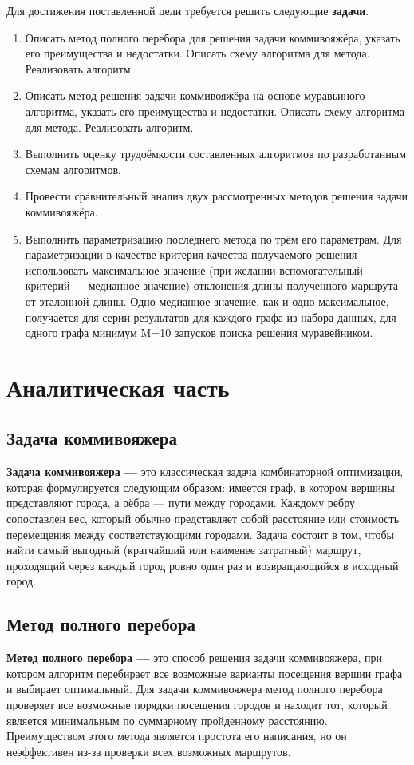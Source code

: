\documentclass[12pt, a4paper]{article}
\begin{document}
Для достижения поставленной цели требуется решить следующие 
\textbf{задачи}.
\begin{enumerate}
\item Описать метод полного перебора для решения 
задачи коммивояжёра, указать его преимущества и 
недостатки. Описать схему алгоритма для метода. 
Реализовать алгоритм.

\item Описать метод решения задачи коммивояжёра на 
основе муравьиного алгоритма, указать его 
преимущества и недостатки. Описать схему алгоритма 
для метода. Реализовать алгоритм.

\item Выполнить оценку трудоёмкости составленных 
алгоритмов по разработанным схемам алгоритмов.

\item Провести сравнительный анализ двух 
рассмотренных методов решения задачи коммивояжёра.
\item Выполнить параметризацию последнего метода по трём его 
параметрам. Для параметризации в качестве критерия качества получаемого 
решения использовать максимальное значение (при желании вспомогательный 
критерий --- медианное значение) отклонения длины полученного маршрута 
от эталонной длины. Одно медианное значение, как и одно максимальное, 
получается для серии результатов для каждого графа из набора данных, 
для одного графа минимум M=10 запусков поиска решения муравейником.



\end{enumerate}
\newpage
\section{Аналитическая часть}
\subsection{Задача коммивояжера}
\textbf{Задача коммивояжера ---} это классическая задача 
комбинаторной оптимизации, которая формулируется следующим образом: 
имеется граф, в котором вершины представляют города, а рёбра — 
пути между городами. Каждому ребру сопоставлен вес, который обычно 
представляет собой расстояние или стоимость перемещения между 
соответствующими городами. Задача состоит в том, чтобы найти самый 
выгодный (кратчайший или наименее затратный) маршрут, проходящий 
через каждый город ровно один раз и возвращающийся в исходный город.
\subsection{Метод полного перебора}
\textbf{Метод полного перебора ---} это способ решения задачи 
коммивояжера, при котором алгоритм перебирает все возможные 
варианты посещения вершин графа и выбирает оптимальный. Для задачи 
коммивояжера метод полного перебора проверяет все возможные порядки 
посещения городов и находит тот, который является минимальным по 
суммарному пройденному расстоянию.
Преимуществом этого метода является простота его написания, но он
неэффективен из-за проверки всех возможных маршрутов.
\end{document}
